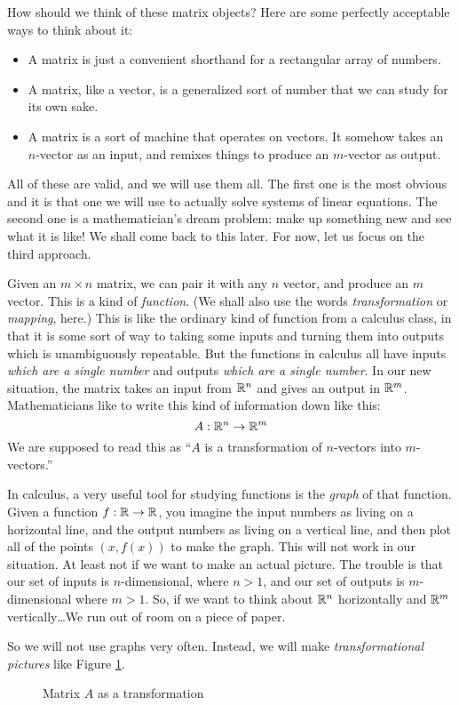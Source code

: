 \documentclass[00-livre-main.tex]{subfiles}
\begin{document}
How should we think of these matrix objects? Here are some perfectly acceptable ways to think about it:
\begin{itemize}
\item A matrix is just a convenient shorthand for a rectangular array of numbers.
\item A matrix, like a vector, is a generalized sort of number that we can study for its own sake.
\item A matrix is a sort of machine that operates on vectors. It somehow takes an $n$-vector as an input, and remixes things to produce an $m$-vector as output.
\end{itemize}
All of these are valid, and we will use them all. The first one is the most obvious and it is that one we will use to actually solve systems of linear equations. The second one is a mathematician's dream problem: make up something new and see what it is like! We shall come back to this later. For now, let us focus on the third approach.

Given an $m\times n$ matrix, we can pair it with any $n$ vector, and produce an $m$ vector. This is a kind of \emph{function}. (We shall also use the words \emph{transformation} or \emph{mapping}, here.) This is like the ordinary kind of function from a calculus class, in that it is some sort of way to taking some inputs and turning them into outputs which is unambiguously repeatable. But the functions in calculus all have inputs \emph{which are a single number} and outputs \emph{which are a single number}. In our new situation, the matrix takes an input from $\mathbb{R}^n$ and gives an output in $\mathbb{R}^m$. Mathematicians like to write this kind of information down like this:
\[
A : \mathbb{R}^n \rightarrow \mathbb{R}^m
\]
We are supposed to read this as ``$A$ is a transformation of $n$-vectors into $m$-vectors.''

In calculus, a very useful tool for studying functions is the \emph{graph} of that function. Given a function $f:\mathbb{R} \rightarrow \mathbb{R}$, you imagine the input numbers as living on a horizontal line, and the output numbers as living on a vertical line, and then plot all of the points $(x, f(x))$ to make the graph.  This will not work in our situation. At least not if we want to make an actual picture. The trouble is that our set of inputs is $n$-dimensional, where $n>1$, and our set of outputs is $m$-dimensional where $m>1$. So, if we want to think about $\mathbb{R}^n$ horizontally and $\mathbb{R}^m$ vertically\dots We run out of room on a piece of paper.

So we will not use graphs very often. Instead, we will make \emph{transformational pictures} like Figure \ref{fig:trans-pic-1}.
\begin{figure}[h]
\centering
{}
\caption{Matrix $A$ as a transformation}
\label{fig:trans-pic-1}
\end{figure}
\end{document}
